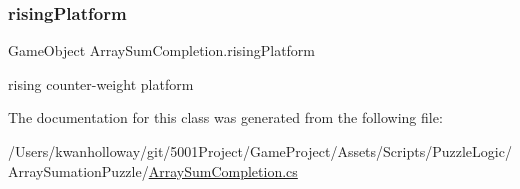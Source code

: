\subsubsection{\texorpdfstring{rising\+Platform}{risingPlatform}}
{\footnotesize\ttfamily Game\+Object Array\+Sum\+Completion.\+rising\+Platform}



rising counter-\/weight platform 



The documentation for this class was generated from the following file\+:\begin{DoxyCompactItemize}
\item 
/\+Users/kwanholloway/git/5001\+Project/\+Game\+Project/\+Assets/\+Scripts/\+Puzzle\+Logic/\+Array\+Sumation\+Puzzle/\hyperlink{_array_sum_completion_8cs}{Array\+Sum\+Completion.\+cs}\end{DoxyCompactItemize}
